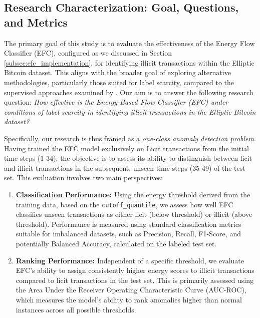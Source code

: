 \documentclass[12pt]{article}
\begin{document}
\subsection{Research Characterization: Goal, Questions, and Metrics} \label{subsec:task}

The primary goal of this study is to evaluate the effectiveness of the Energy Flow Classifier (EFC), configured
as we discussed in Section \ref{subsec:efc_implementation}, for identifying illicit transactions within the Elliptic
Bitcoin dataset. This aligns with the broader goal of exploring alternative methodologies, particularly those suited for
label scarcity, compared to the supervised approaches examined by \cite{lorenz2021machinelearningmethodsdetect}. Our aim
is to answer the following research question: \emph{How effective is the Energy-Based Flow Classifier (EFC) under conditions
of label scarcity in identifying illicit transactions in the Elliptic Bitcoin dataset?}

Specifically, our research is thus framed as a \emph{one-class anomaly detection problem}. Having trained the EFC model exclusively
on Licit transactions from the initial time steps (1-34), the objective is to assess its ability to distinguish between
licit and illicit transactions in the subsequent, unseen time steps (35-49) of the test set. This evaluation involves
two main perspectives:

\begin{enumerate}
    \item \textbf{Classification Performance:} Using the energy threshold derived from the training data, based on the
      \texttt{cutoff\_quantile}, we assess how well EFC classifies unseen transactions as either licit (below threshold)
      or illicit (above threshold). Performance is measured using standard classification metrics suitable for imbalanced
      datasets, such as Precision, Recall, F1-Score, and potentially Balanced Accuracy, calculated on the labeled test set.
      
    \item \textbf{Ranking Performance:} Independent of a specific threshold, we evaluate EFC's ability to assign consistently
      higher energy scores to illicit transactions compared to licit transactions in the test set. This is primarily
      assessed using the Area Under the Receiver Operating Characteristic Curve (AUC-ROC), which measures the model's
      ability to rank anomalies higher than normal instances across all possible thresholds.
\end{enumerate}
\end{document}
